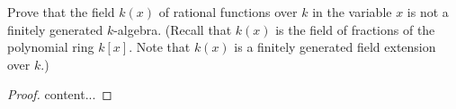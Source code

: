 \documentclass[10pt]{article}
\newenvironment{problem}[2][Problem]{\begin{trivlist}
		\item[\hskip \labelsep {\bfseries #1}\hskip \labelsep {\bfseries #2.}]}{\end{trivlist}}
\begin{document}
	\begin{problem}{1.3}
		Prove that the field $k(x)$ of rational functions over $k$ in the variable $x$ is not a finitely generated $k$-algebra. (Recall that $k(x)$ is the field of fractions of the polynomial ring $k[x]$. Note that $k(x)$ is a finitely generated field extension over $k$.)
		\begin{proof}
			content...
		\end{proof}
	\end{problem}
\end{document}
